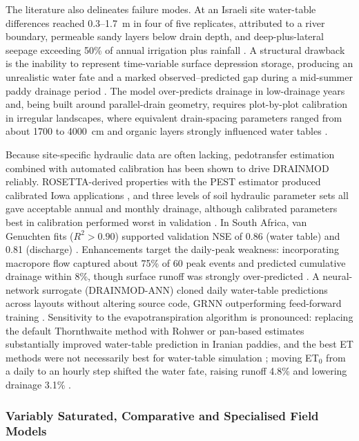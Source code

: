The literature also delineates failure modes. At an Israeli site water-table differences reached 0.3--1.7~m in four of five replicates, attributed to a river boundary, permeable sandy layers below drain depth, and deep-plus-lateral seepage exceeding 50\% of annual irrigation plus rainfall \parencite{Sinai2006}. A structural drawback is the inability to represent time-variable surface depression storage, producing an unrealistic water fate and a marked observed--predicted gap during a mid-summer paddy drainage period \parencite{Abduljaleel2023}. The model over-predicts drainage in low-drainage years \parencite{Singh2006b} and, being built around parallel-drain geometry, requires plot-by-plot calibration in irregular landscapes, where equivalent drain-spacing parameters ranged from about 1700 to 4000~cm and organic layers strongly influenced water tables \parencite{He2002}.

Because site-specific hydraulic data are often lacking, pedotransfer estimation combined with automated calibration has been shown to drive \textsc{DRAINMOD} reliably. ROSETTA-derived properties with the PEST estimator produced calibrated Iowa applications \parencite{Singh2006b}, and three levels of soil hydraulic parameter sets all gave acceptable annual and monthly drainage, although calibrated parameters best in calibration performed worst in validation \parencite{Qi2015}. In South Africa, van Genuchten fits ($R^2>0.90$) supported validation NSE of 0.86 (water table) and 0.81 (discharge) \parencite{Malota2024,Malota2015}. Enhancements target the daily-peak weakness: incorporating macropore flow captured about 75\% of 60 peak events and predicted cumulative drainage within 8\%, though surface runoff was strongly over-predicted \parencite{Askar2020}. A neural-network surrogate (\textsc{DRAINMOD-ANN}) cloned daily water-table predictions across layouts without altering source code, GRNN outperforming feed-forward training \parencite{Awad2022,Awad2022b}. Sensitivity to the evapotranspiration algorithm is pronounced: replacing the default Thornthwaite method with Rohwer or pan-based estimates substantially improved water-table prediction in Iranian paddies, and the best ET methods were not necessarily best for water-table simulation \parencite{Malakshahi2020}; moving ET$_0$ from a daily to an hourly step shifted the water fate, raising runoff 4.8\% and lowering drainage 3.1\% \parencite{Awad2022b}.

\subsubsection{Variably Saturated, Comparative and Specialised Field Models}

